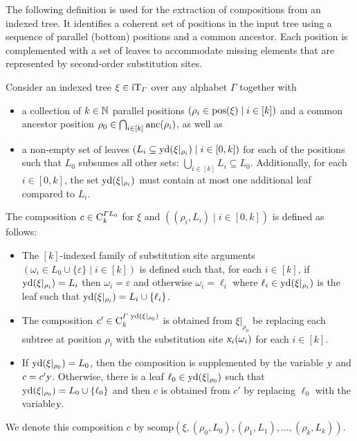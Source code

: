 \documentclass[../../document.tex]{subfiles}
\begin{document}
    The following definition is used for the extraction of  compositions from an indexed tree.
    It identifies a coherent set of positions in the input tree using a sequence of parallel (bottom) positions and a common ancestor.
    Each position is complemented with a set of leaves to accommodate missing elements that are represented by second-order substitution sites.

    \begin{definition}\label{def:dcp:comp}
        Consider an indexed tree \(\xi \in \operatorname{iT}_{\varGamma}\) over any alphabet \(\varGamma\) together with
        \begin{itemize}
            \item
                a collection of \(k \in \mathbb{N}\) parallel positions \((\rho_i \in \operatorname{pos}(\xi) \mid i \in [k])\) and
                a common ancestor position \(\rho_0 \in \bigcap_{i \in [k]} \operatorname{anc}(\rho_i)\), as well as
            \item
                a non-empty set of leaves \((L_i \subseteq \operatorname{yd}(\xi|_{\rho_i}) \mid i \in [0, k])\) for each of the positions such that
                \(L_0\) subsumes all other sets: \(\bigcup_{i\in[k]} L_i \subseteq L_0\). Additionally, for each \(i \in [0,k]\), the set \(\operatorname{yd}(\xi|_{\rho_i})\) must contain at most one additional leaf compared to \(L_i\).
        \end{itemize}

        The  composition \(c \in \mathrm{C}^{\varGamma L_0}_k\) for \(\xi\) and \(((\rho_i, L_i) \mid i \in [0,k])\) is defined as follows:
        \begin{itemize}
            \item
                The \([k]\)-indexed family of substitution site arguments \((\omega_i \in L_0 \cup \{\varepsilon\} \mid i \in [k])\) is defined such that, for each \(i\in[k]\), if \(\operatorname{yd}(\xi|_{\rho_i}) = L_i\) then \(\omega_i = \varepsilon\) and otherwise \(\omega_i = \ell_i\) where \(\ell_i \in \operatorname{yd}(\xi|_{\rho_i})\) is the leaf such that \(\operatorname{yd}(\xi|_{\rho_i}) = L_i \cup \{\ell_i\}\).
            \item
                The composition \(c' \in \mathrm{C}^{\varGamma\,\operatorname{yd}(\xi|_{\rho_0})}_k\) is obtained from \(\xi|_{\rho_0}\) be replacing each subtree at position \(\rho_i\) with the substitution site \(\textsl{x}_i(\omega_i)\) for each \(i \in [k]\).
            \item
                If \(\operatorname{yd}(\xi|_{\rho_0}) = L_0\), then the composition is supplemented by the variable \(\textsl{y}\) and \(c=c' \textsl{y}\).
                Otherwise, there is a leaf \(\ell_0 \in \operatorname{yd}(\xi|_{\rho_0})\) such that \(\operatorname{yd}(\xi|_{\rho_0}) = L_0 \cup \{\ell_0\}\) and then \(c\) is obtained from \(c'\) by replacing \(\ell_0\) with the variable\(\textsl{y}\).
        \end{itemize}
        We denote this composition \(c\) by \(\mathrm{scomp}(\xi, (\rho_0, L_0), (\rho_1, L_1), \ldots, (\rho_k, L_k))\).
    \end{definition}
\end{document}
